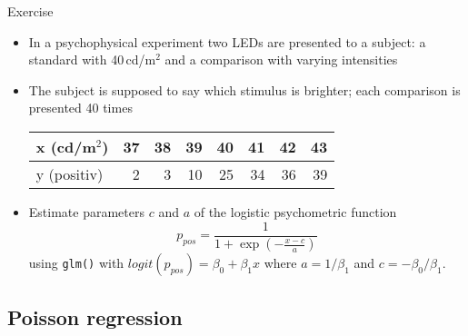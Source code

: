 \documentclass[aspectratio=169]{beamer}
\begin{document}
\begin{frame}[fragile]{}
  \begin{block}{Exercise}
    \begin{itemize}
\item In a psychophysical experiment two LEDs are presented to a
  subject: a standard with 40\,cd/m$^2$ and a comparison with varying
        intensities
    \item The subject is supposed to say which stimulus is
      brighter; each comparison is presented 40 times
        \vspace{.2cm}
\begin{center}
\begin{tabular}{l|rrrrrrr}
x (cd/m$^2$)  & 37 & 38 & 39 & 40 & 41 & 42 & 43 \\ \hline
y (positiv)   &  2 &  3 & 10 & 25 & 34 & 36 & 39
\end{tabular}
\end{center}
        \vspace{.2cm}
\item Estimate parameters $c$ and $a$ of the logistic psychometric function
\[
  p_{pos} = \frac{1}{1 +
    \exp(-\frac{\displaystyle x - c}{\displaystyle a})}
\]
using \texttt{glm()} with $logit(p_{pos}) = \beta_0 + \beta_1x$ where 
        $a = 1/\beta_1$ and $c = -\beta_0/\beta_1$.
    \end{itemize}
  \end{block}
\end{frame}


\subsection{Poisson regression}
\end{document}
